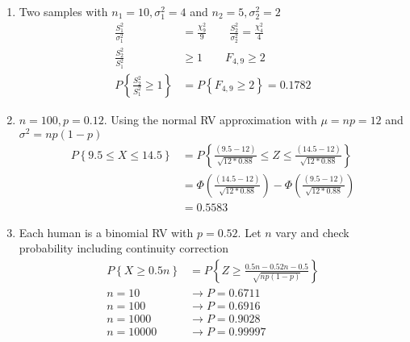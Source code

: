 \begin{enumerate}
\begin{figure}[H]
	\end{figure}
	
	\item Two samples with $ n_1 = 10, \sigma^2_1  = 4$ and $ n_2 = 5, \sigma^2_2  = 2$ \\
	
	
		\begin{align}
			\frac{S_1^2}{\sigma_1^2} &= \frac{\chi_9^2}{9} \qquad \frac{S_2^2}{\sigma_2^2} = \frac{\chi_4^2}{4} \nonumber \\
			\frac{S_2^2}{S_1^2} &\geq 1 \qquad F_{4, 9} \geq 2 \nonumber \\
			P  \left\{\frac{S_2^2}{S_1^2}  \geq 1\right\}  &= P \left\{F_{4, 9} \geq 2\right\}= 0.1782
		\end{align}
	
	
	\item $ n = 100, p  = 0.12$. Using the normal RV approximation with $ \mu = np = 12 $ and $ \sigma^2 = np(1-p)$ \\
	
	
		\begin{align}
			P \left\{9.5 \leq X \leq 14.5 \right\} &= P \left\{\frac{(9.5 - 12)}{\sqrt{12*0.88}} \leq Z \leq \frac{(14.5 - 12)}{\sqrt{12*0.88}} \right\} \nonumber \\
			&= \Phi  \left(\frac{(14.5 - 12)}{\sqrt{12*0.88}}\right) - \Phi  \left(\frac{(9.5 - 12)}{\sqrt{12*0.88}}\right)  \nonumber \\
			&= 0.5583
		\end{align}
	
	
	\item Each human is a binomial RV with $ p = 0.52 $. Let $ n $ vary and check probability including continuity correction\\
	
		\begin{align}
			P \left\{ X \geq 0.5n \right\} &= P \left\{ Z \geq \frac{0.5n - 0.52n - 0.5}{\sqrt{np(1-p)}} \right\} \\
			n = 10 &\to P = 0.6711 \nonumber \\
			n = 100 &\to P = 0.6916 \nonumber \\
			n = 1000 &\to P = 0.9028 \nonumber \\
			n = 10000 &\to P = 0.99997 \nonumber 
		\end{align}
	

\end{enumerate}
